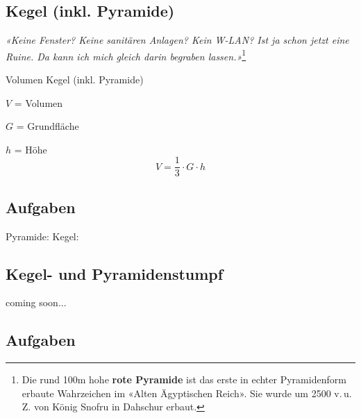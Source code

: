 \subsection{Kegel (inkl. Pyramide)}



\begin{center}
{\textit{«Keine Fenster? Keine sanitären Anlagen? Kein W-LAN? Ist ja schon
jetzt eine Ruine. Da kann ich mich gleich darin begraben
lassen.»}}\footnote{Die rund 100m hohe \textbf{rote Pyramide} ist das
  erste in echter Pyramidenform erbaute Wahrzeichen im «Alten
  Ägyptischen Reich». Sie wurde um 2500 v.\,u.\,Z. von König Snofru in
Dahschur erbaut.}
\end{center}


\begin{gesetz}{Volumen Kegel (inkl. Pyramide)}{}
  
  $V$ = Volumen
  
  $G$ = Grundfläche

  $h$ = Höhe
  $$V = \frac13\cdot{}G\cdot{}h$$
  \end{gesetz}

\subsection*{Aufgaben}
Pyramide:
Kegel:
\newpage

\subsection{Kegel- und Pyramidenstumpf}
coming soon...
\subsection*{Aufgaben}
\newpage
